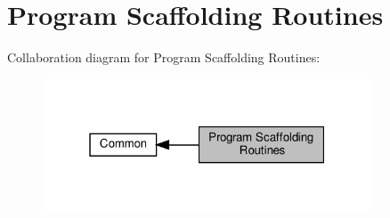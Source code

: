 \hypertarget{group__scaffolding}{}\section{Program Scaffolding Routines}
\label{group__scaffolding}
Collaboration diagram for Program Scaffolding Routines\+:
\nopagebreak
\begin{figure}[H]
\begin{center}
\leavevmode
\includegraphics[width=277pt]{group__scaffolding}
\end{center}
\end{figure}
